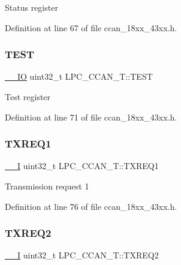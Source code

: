 Status register 

Definition at line 67 of file ccan\+\_\+18xx\+\_\+43xx.\+h.

\mbox{\label{struct_l_p_c___c_c_a_n___t_acd1d1d407e8080f67dc06c40bd2398c6}} 
\subsubsection{\texorpdfstring{T\+E\+ST}{TEST}}
{\footnotesize\ttfamily \hyperlink{core__sc300_8h_aec43007d9998a0a0e01faede4133d6be}{\+\_\+\+\_\+\+IO} uint32\+\_\+t L\+P\+C\+\_\+\+C\+C\+A\+N\+\_\+\+T\+::\+T\+E\+ST}

Test register 

Definition at line 71 of file ccan\+\_\+18xx\+\_\+43xx.\+h.

\mbox{\label{struct_l_p_c___c_c_a_n___t_aa33e25eb1bee73e12ab18d2e647aa37d}} 
\subsubsection{\texorpdfstring{T\+X\+R\+E\+Q1}{TXREQ1}}
{\footnotesize\ttfamily \hyperlink{core__sc300_8h_af63697ed9952cc71e1225efe205f6cd3}{\+\_\+\+\_\+I} uint32\+\_\+t L\+P\+C\+\_\+\+C\+C\+A\+N\+\_\+\+T\+::\+T\+X\+R\+E\+Q1}

Transmission request 1 

Definition at line 76 of file ccan\+\_\+18xx\+\_\+43xx.\+h.

\mbox{\label{struct_l_p_c___c_c_a_n___t_a1e69d8d4c4774815b3ecca784aa6596d}} 
\subsubsection{\texorpdfstring{T\+X\+R\+E\+Q2}{TXREQ2}}
{\footnotesize\ttfamily \hyperlink{core__sc300_8h_af63697ed9952cc71e1225efe205f6cd3}{\+\_\+\+\_\+I} uint32\+\_\+t L\+P\+C\+\_\+\+C\+C\+A\+N\+\_\+\+T\+::\+T\+X\+R\+E\+Q2}

